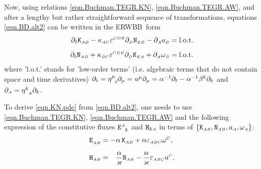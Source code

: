 \documentclass[
10pt, %
a4paper, %
oneside, %
headinclude,footinclude, %
BCOR5mm, %
]{scrartcl}
\newcommand{\ERWBB}{ERWBB}
\newcommand{\sA}{\mathsmaller A}
\newcommand{\sB}{\mathsmaller B}
\newcommand{\sC}{\mathsmaller C}
\newcommand{\sD}{\mathsmaller D}
\newcommand{\sE}{\mathsmaller E}
\newcommand{\pd}[1]{\partial_{#1}}
\newcommand{\mg}[1]{\kappa_{#1}}			%
\newcommand{\itetrsymbol}{\eta}
\newcommand{\itetr}[2]{\itetrsymbol^{#1}_{\phantom{#1}#2}}
\newcommand{\Hfin}[2]{\mathtt{H}_{#2#1}}	%
\newcommand{\Efin}[2]{\mathtt{E}^{#1}_{\phantom{#1}#2}}	%
\newcommand{\Kbuch}[2]{\mathtt{K}_{{#1}{#2}}}	%
\newcommand{\Nbuchdown}[2]{\mathtt{N}_{#1#2}}	%
\newcommand{\LCtens}{\varepsilon} %
\newcommand{\indalg}[1]{\hat{\mathsmaller{#1}}}
\newcommand{\lapse}{\alpha}
\newcommand{\shift}[1]{\beta^{#1}}
\begin{document}
Now, using relations \eqref{eqn.Buchman.TEGR.KN}, \eqref{eqn.Buchman.TEGR.AW}, and after a lengthy 
but 
rather straightforward sequence of transformations, 
equations \eqref{eqn.BD.alt2}
can be written in the \ERWBB\ form
\begin{subequations}\label{eqn.KN.pde}
	\begin{align}
		\pd{\indalg{0}} \Kbuch{\sA}{\sB}
		- \mg{\sA\sC}\LCtens^{\sC\sD\sE} \pd{\sD} \Nbuchdown{\sE}{\sB}
		- \pd{\sA} a_{\sB} &= \text{l.o.t.}
		\\[2mm]
		\pd{\indalg{0}} \Nbuchdown{\sA}{\sB}
		+ \mg{\sB\sC}\LCtens^{\sC\sD\sE} \pd{\sD} \Kbuch{\sE}{\sA}
		+ \pd{\sA} \omega_{\sB} &= \text{l.o.t.}
	\end{align}
\end{subequations}
where 'l.o.t.' stands for 'low-order terms' (i.e. algebraic terms that do not contain space and 
time 
derivatives) $ \pd{\indalg{0}} = \itetr{\mu}{\indalg{0}}\pd{\mu} = u^\mu\pd{\mu} = 
\lapse^{-1}\pd{t} - 
\lapse^{-1}\shift{k}\pd{k}$ and $ \pd{\sA} = \itetr{k}{\sA}\pd{k} $. 

To derive \eqref{eqn.KN.pde} from \eqref{eqn.BD.alt2}, one needs to use 
\eqref{eqn.Buchman.TEGR.KN}, \eqref{eqn.Buchman.TEGR.AW} and the following expression of the 
constitutive fluxes $ \Efin{\sA}{k} $ and $ \Hfin{\sA}{k} $ in terms of $ 
\{\Kbuch{\sA}{\sB},\Nbuchdown{\sA}{\sB},a_{\sA},\omega_{\sA}\} $:
\begin{align}\label{eqn.const.KN}
	\Efin{}{\sA\sB} &=
	- \lapse \,\Kbuch{\sA}{\sB} 
	+ \lapse \LCtens_{\sA\sB\sC} \omega^\sC ,
	\\[2mm]
	\Hfin{\sB}{\sA} &= 
	\phantom{-}\frac{\lapse}{\varkappa} \Nbuchdown{\sA}{\sB} 
	- \frac{\lapse}{\varkappa} 
	\LCtens_{\sA\sB\sC} a^\sC .
\end{align}
\end{document}
